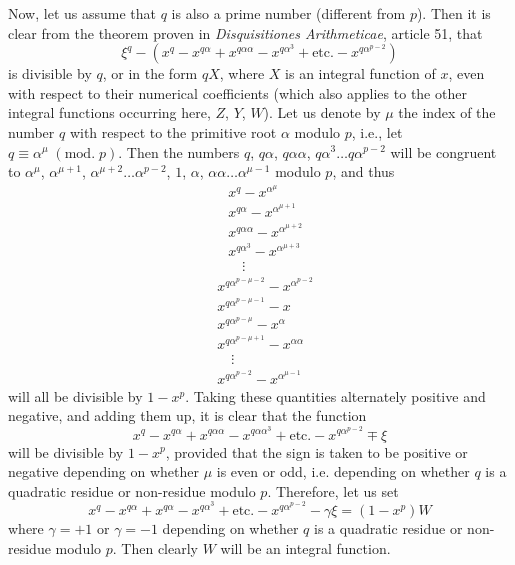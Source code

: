 \documentclass[twoside,12pt]{memoir}
\renewcommand{\pmod}[1]{\;(\textrm{mod.}\;#1)}
\begin{document}
Now, let us assume that \(q\) is also a prime number (different from \(p\)).  Then it is clear from the theorem proven in  \textit{Disquisitiones Arithmeticae}, article 51, that
\[\xi^{q}-(x^{q}-x^{q \alpha}+x^{q \alpha \alpha}-x^{q \alpha^{3}}+\text{etc{.}}-x^{q \alpha^{p-2}})\]
is divisible by \(q\), or in the form \(qX\), where \(X\) is an integral function of \(x\), even with respect to their numerical coefficients (which also applies to the other integral functions occurring here, \(Z\), \(Y\), \(W\)). Let us denote by \(\mu\) the index of the number \(q\) with respect to the primitive root \(\alpha\) modulo \(p\), i{.}e{.}, let \(q \equiv \alpha^{\mu}\pmod{p}\). Then the numbers \(q\), \(q \alpha\), \(q \alpha \alpha\), \(q \alpha^{3}\ldots q \alpha^{p-2}\) will be congruent to \(\alpha^{\mu}\), \(\alpha^{\mu+1}\), \(\alpha^{\mu+2}\ldots \alpha^{p-2}\), \(1\), \(\alpha\), \(\alpha \alpha\ldots \alpha^{\mu-1}\) modulo \(p\), and thus
\[\begin{aligned}
&x^{q}-x^{\alpha^{\mu}} \\
&x^{q \alpha}-x^{\alpha^{\mu+1}} \\
&x^{q \alpha \alpha}-x^{\alpha^{\mu+2}} \\
&x^{q \alpha^{3}}-x^{\alpha^{\mu+3}}\\
&\quad \vdots \end{aligned}\]
\[\begin{aligned}
&x^{q \alpha^{p-\mu-2}}-x^{\alpha^{p-2}}\\
&x^{q \alpha^{p-\mu-1}}-x\\
&x^{q \alpha^{p-\mu}}-x^{\alpha}\\
&x^{q \alpha^{p-\mu+1}}-x^{\alpha \alpha}\\
&\quad \vdots\\
&x^{q\alpha^{p-2}}-x^{\alpha^{\mu-1}}
\end{aligned}\]
will all be divisible by \(1-x^{p}\). Taking these quantities alternately positive and negative, and adding them up, it is clear that the function
\[x^{q}-x^{q \alpha}+x^{q \alpha \alpha}-x^{q \alpha \alpha^{3}}+\text{etc{.}}-x^{q \alpha^{p-2}}\mp \xi\]
will be divisible by \(1-x^{p}\), provided that the sign is taken to be positive or negative depending on whether \(\mu\) is even or odd, i.e{.} depending on whether \(q\) is a quadratic residue or non-residue modulo \(p\). Therefore, let us set
\[x^{q}-x^{q \alpha}+x^{q \alpha}-x^{q \alpha^{3}}+\text{etc{.}}-x^{q \alpha^{p-2}}-\gamma \xi=(1-x^{p})W\]
where \(\gamma=+1\) or \(\gamma=-1\) depending on whether \(q\) is a quadratic residue or non-residue modulo \(p\).  Then clearly \(W\) will be an integral function.
%
\end{document}
